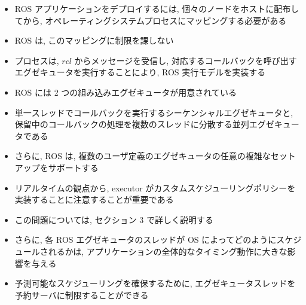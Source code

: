 \begin{frame}{}
    \begin{itemize}
        \item ROS アプリケーションをデプロイするには, 個々のノードをホストに配布してから, オペレーティングシステムプロセスにマッピングする必要がある
        \item ROS は, このマッピングに制限を課しない
        \item プロセスは, $r c l$ からメッセージを受信し, 対応するコールバックを呼び出すエグゼキュータを実行することにより, ROS 実行モデルを実装する
        \item ROS には 2 つの組み込みエグゼキュータが用意されている
        \item 単一スレッドでコールバックを実行するシーケンシャルエグゼキュータと, 保留中のコールバックの処理を複数のスレッドに分散する並列エグゼキュータである
        \item さらに, ROS は, 複数のユーザ定義のエグゼキュータの任意の複雑なセットアップをサポートする
    \end{itemize}
\end{frame}

\begin{frame}{}
    \begin{itemize}
        \item リアルタイムの観点から, executor がカスタムスケジューリングポリシーを実装することに注意することが重要である
        \item この問題については, セクション 3 で詳しく説明する
        \item さらに, 各 ROS エグゼキュータのスレッドが OS によってどのようにスケジュールされるかは, アプリケーションの全体的なタイミング動作に大きな影響を与える
        \item 予測可能なスケジューリングを確保するために, エグゼキュータスレッドを予約サーバに制限することができる
    \end{itemize}
\end{frame}




